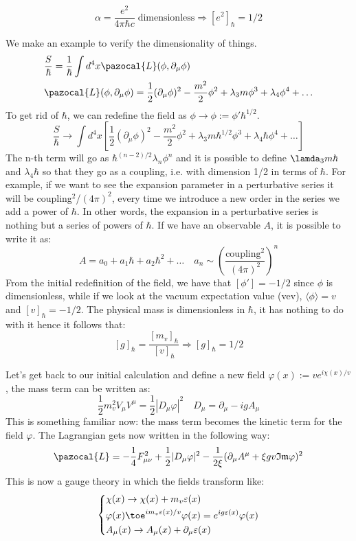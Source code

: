 \documentclass[../main.tex]{subfiles}
\begin{document}
\[
\alpha=\frac{e^2}{4\pi\hbar c} \;\text{dimensionless}\Rightarrow[e^2]_\hbar=1/2
\]
\begin{example} We make an example to verify the dimensionality of things.
\begin{align*}
&\frac{S}{\hbar}=\frac{1}{\hbar}\int d^4x\pazocal{L}(\phi,\partial_\mu\phi)\\
&\pazocal{L}(\phi,\partial_\mu\phi)=\frac{1}{2}(\partial_\mu\phi)^2-\frac{m^2}{2}\phi^2+\lambda_3m\phi^3+\lambda_4\phi^4+\dots
\end{align*}
To get rid of $\hbar$, we can redefine the field as $\phi\to\phi:=\phi'\hbar^{1/2}$.
\[
\frac{S}{\hbar}\to\int d^4x\left[\frac{1}{2}(\partial_\mu\phi)^2-\frac{m^2}{2}\phi^2+\lambda_3m\hbar^{1/2}\phi^3+\lambda_4\hbar\phi^4+\dots\right]
\]
The n-th term will go as $\hbar^{(n-2)/2}\lambda_n\phi^n$ and it is possible to define $\lamda_3m\hbar$ and $\lambda_4\hbar$ so that they go as a coupling, i.e. with dimension 1/2 in terms of $\hbar$. For example, if we want to see the expansion parameter in a perturbative series it will be coupling$^2$/$(4\pi)^2$, every time we introduce a new order in the series we add a power of $\hbar$. In other words, the expansion in a perturbative series is nothing but a series of powers of $\hbar$. If we have an observable $A$, it is possible to write it as:
\[
A=a_0+a_1\hbar+a_2\hbar^2+\dots \quad a_n\sim\left(\frac{\text{coupling}^2}{(4\pi)^2}\right)^n
\]
From the initial redefinition of the field, we have that $[\phi']=-1/2$ since $\phi$ is dimensionless, while if we look at the vacuum expectation value (vev), $\langle\phi\rangle=v$ and $[v]_\hbar=-1/2$. The physical mass is dimensionless in $\hbar$, it has nothing to do with it hence it follows that:
\[
[g]_\hbar=\frac{[m_v]_\hbar}{[v]_\hbar}\Rightarrow[g]_\hbar=1/2
\]
\end{example}
Let's get back to our initial calculation and define a new field $\varphi(x):=ve^{i\chi(x)/v}$, the mass term can be written as:
\[
\frac{1}{2}m_v^2V_\mu V^\mu=\frac{1}{2}|D_\mu\varphi|^2 \quad D_\mu=\partial_\mu-igA_\mu
\]
This is something familiar now: the mass term becomes the kinetic term for the field $\varphi$. The Lagrangian gets now written in the following way:
\[
\pazocal{L}=-\frac{1}{4}F_{\mu\nu}^2+\frac{1}{2}|D_\mu\varphi|^2-\frac{1}{2\xi}(\partial_\mu A^\mu+\xi gv\mathfrak{Im}\varphi)^2
\]
This is now a gauge theory in which the fields transform like:
\[
\left\{
\begin{aligned}
&\chi(x)\to\chi(x)+m_v\varepsilon(x)\\
&\varphi(x)\toe^{im_v\varepsilon(x)/v}\varphi(x)=e^{ig\varepsilon(x)}\varphi(x)\\
&A_\mu(x)\to A_\mu(x)+\partial_\mu\varepsilon(x)
\end{aligned}
\right.
\]
\end{document}
